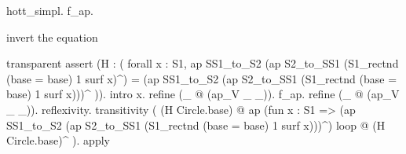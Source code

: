 \begin{coqdoccode}
\begin{coqdoccomment}
hott\_simpl.\coqdocindent{0.50em}
f\_ap.\coqdoceol
\coqdoceol
\coqdoceol
\coqdocindent{1.00em}
\begin{coqdoccomment}
\coqdocindent{0.50em}
invert\coqdocindent{0.50em}
the\coqdocindent{0.50em}
equation\coqdocindent{0.50em}
\end{coqdoccomment}
\coqdoceol
\coqdocindent{1.00em}
transparent\coqdocindent{0.50em}
assert\coqdocindent{0.50em}
(H\coqdocindent{0.50em}
:\coqdocindent{0.50em}
(\coqdoceol
\coqdocindent{2.00em}
forall\coqdocindent{0.50em}
x\coqdocindent{0.50em}
:\coqdocindent{0.50em}
S1,\coqdocindent{0.50em}
\coqdoceol
\coqdocindent{3.00em}
ap\coqdocindent{0.50em}
SS1\_to\_S2\coqdocindent{0.50em}
(ap\coqdocindent{0.50em}
S2\_to\_SS1\coqdocindent{0.50em}
(S1\_rectnd\coqdocindent{0.50em}
(base\coqdocindent{0.50em}
=\coqdocindent{0.50em}
base)\coqdocindent{0.50em}
1\coqdocindent{0.50em}
surf\coqdocindent{0.50em}
x)\^{})\coqdoceol
\coqdocindent{3.00em}
=\coqdoceol
\coqdocindent{3.00em}
(ap\coqdocindent{0.50em}
SS1\_to\_S2\coqdocindent{0.50em}
(ap\coqdocindent{0.50em}
S2\_to\_SS1\coqdocindent{0.50em}
(S1\_rectnd\coqdocindent{0.50em}
(base\coqdocindent{0.50em}
=\coqdocindent{0.50em}
base)\coqdocindent{0.50em}
1\coqdocindent{0.50em}
surf\coqdocindent{0.50em}
x)))\^{}\coqdoceol
\coqdocindent{1.00em}
)).\coqdoceol
\coqdocindent{1.00em}
intro\coqdocindent{0.50em}
x.\coqdoceol
\coqdocindent{1.00em}
refine\coqdocindent{0.50em}
(\_\coqdocindent{0.50em}
@\coqdocindent{0.50em}
(ap\_V\coqdocindent{0.50em}
\_\coqdocindent{0.50em}
\_)).\coqdocindent{0.50em}
f\_ap.\coqdoceol
\coqdocindent{1.00em}
refine\coqdocindent{0.50em}
(\_\coqdocindent{0.50em}
@\coqdocindent{0.50em}
(ap\_V\coqdocindent{0.50em}
\_\coqdocindent{0.50em}
\_)).\coqdocindent{0.50em}
reflexivity.\coqdoceol
\coqdocindent{1.00em}
transitivity\coqdocindent{0.50em}
(\coqdoceol
\coqdocindent{3.00em}
(H\coqdocindent{0.50em}
Circle.base)\coqdoceol
\coqdocindent{3.00em}
@\coqdocindent{0.50em}
ap\coqdocindent{0.50em}
(fun\coqdocindent{0.50em}
x\coqdocindent{0.50em}
:\coqdocindent{0.50em}
S1\coqdocindent{0.50em}
=>\coqdocindent{0.50em}
(ap\coqdocindent{0.50em}
SS1\_to\_S2\coqdocindent{0.50em}
(ap\coqdocindent{0.50em}
S2\_to\_SS1\coqdocindent{0.50em}
(S1\_rectnd\coqdocindent{0.50em}
(base\coqdocindent{0.50em}
=\coqdocindent{0.50em}
base)\coqdocindent{0.50em}
1\coqdocindent{0.50em}
surf\coqdocindent{0.50em}
x)))\^{})\coqdocindent{0.50em}
\coqdoceol
\coqdocindent{4.00em}
loop\coqdoceol
\coqdocindent{3.00em}
@\coqdocindent{0.50em}
(H\coqdocindent{0.50em}
Circle.base)\^{}\coqdoceol
\coqdocindent{1.00em}
).\coqdoceol
\coqdocindent{1.00em}
apply\coqdocindent{0.50em}

\end{coqdoccomment}
\end{coqdoccode}
